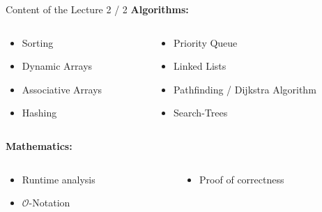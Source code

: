 \begin{frame}{Content of the Lecture 2 / 2}
  \textbf{Algorithms:}
  \begin{columns}
    \begin{column}{0.40\textwidth}
      \begin{itemize}
        \item
          Sorting
        \item
          Dynamic Arrays
        \item
          Associative Arrays
        \item
          Hashing
      \end{itemize}
    \end{column}
    \begin{column}{0.60\textwidth}
      \begin{itemize}
        \item
          Priority Queue
        \item
          Linked Lists
        \item
          Pathfinding / Dijkstra Algorithm
        \item
          Search-Trees
      \end{itemize}
    \end{column}
  \end{columns}
  \vspace*{2.0em}
  \textbf{Mathematics:}
  \begin{columns}
    \begin{column}{0.40\textwidth}
      \begin{itemize}
        \item
          Runtime analysis
        \item
          $\mathcal{O}$-Notation
      \end{itemize}
    \end{column}
    \begin{column}{0.60\textwidth}
      \begin{itemize}
        \item
          Proof of correctness
          \vspace*{1.5em}
      \end{itemize}
    \end{column}
  \end{columns}
\end{frame}